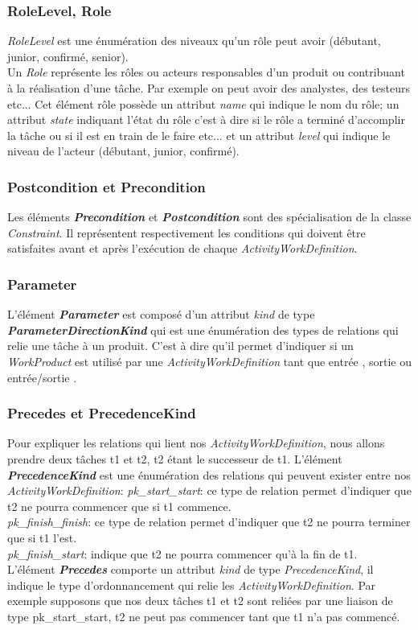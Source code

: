 \subsubsection*{RoleLevel, Role}
\textit{RoleLevel} est une énumération des niveaux qu'un rôle peut avoir (débutant, junior, confirmé, senior).\\
Un \textit{Role} représente les rôles ou acteurs responsables d'un produit ou contribuant à la réalisation d'une tâche. Par exemple on peut avoir des analystes, des testeurs etc... Cet élément rôle possède un attribut \textit{name} qui indique le nom du rôle;  un attribut \textit{state} indiquant l'état du rôle c'est à dire si le rôle a terminé d'accomplir la tâche ou si il est en train de le faire etc... et un attribut \textit{level} qui indique le niveau de l'acteur (débutant, junior, confirmé). 
\subsubsection*{Postcondition et Precondition}
Les éléments \textbf{\textit{Precondition}} et \textbf{\textit{Postcondition}} sont des spécialisation de la classe \textit{Constraint}. Il représentent respectivement les conditions qui doivent être satisfaites avant et après l'exécution de chaque \textit{ActivityWorkDefinition}. 
\subsubsection*{Parameter}
L'élément \textbf{\textit{Parameter}} est composé d'un attribut \textit{kind} de type \textbf{\textit{ParameterDirectionKind}} qui est une énumération des types de relations qui relie une tâche à un produit. C'est à dire qu'il permet d'indiquer si un \textit{WorkProduct} est utilisé par une \textit{ActivityWorkDefinition} tant que \og entrée \fg{}, \og sortie \fg{} ou \og entrée/sortie \fg{}. 
\subsubsection*{Precedes et PrecedenceKind}
Pour expliquer les relations qui lient nos \textit{ActivityWorkDefinition}, nous allons prendre deux tâches t1 et t2, t2 étant le successeur de t1.
L'élément \textbf{\textit{PrecedenceKind}} est une énumération des relations qui peuvent exister entre nos \textit{ActivityWorkDefinition}: 
\textit{pk\_start\_start}: ce type de relation permet d'indiquer que t2 ne pourra commencer que si t1 commence.\\
\textit{pk\_finish\_finish}: ce type de relation permet d'indiquer que t2 ne pourra terminer que si t1 l'est.\\
\textit{pk\_finish\_start}: indique que t2 ne pourra commencer qu'à la fin de t1.\\
L'élément \textbf{\textit{Precedes}} comporte un attribut \textit{kind} de type \textit{PrecedenceKind}, il indique le type d'ordonnancement qui relie les \textit{ActivityWorkDefinition}. Par exemple supposons que nos deux tâches t1 et t2 sont reliées par une liaison de type pk\_start\_start, t2 ne peut pas commencer tant que t1 n'a pas commencé.
